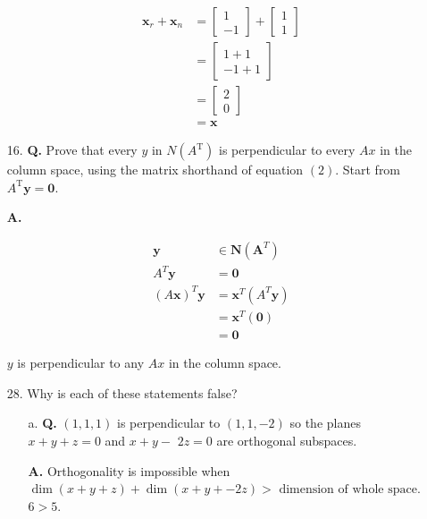 \documentclass[main.tex]{subfiles}
\begin{document}
\begin{enumerate}
    $$
    \begin{aligned}
    \boldsymbol{x}_{r}+\boldsymbol{x}_{n} &=\left[\begin{array}{c}
    1 \\
    -1
    \end{array}\right]+\left[\begin{array}{l}
    1 \\
    1
    \end{array}\right] \\
    &=\left[\begin{array}{c}
    1+1 \\
    -1+1
    \end{array}\right] \\
    &=\left[\begin{array}{l}
    2 \\
    0
    \end{array}\right] \\
    &=\boldsymbol{x}
    \end{aligned}
    $$
    
    \item [16.] \textbf{Q.} Prove that every $y$ in $N\left(A^{\mathrm{T}}\right)$ is perpendicular to every $A x$ in the column space, using the matrix shorthand of equation $(2)$. Start from $A^{\mathrm{T}} \boldsymbol{y}=\mathbf{0}$. 
    
    \textbf{A.}
    
    $$
    \begin{aligned}
    \bm{y} &\in \bm{N}\left(\bm{A}^{T}\right)\\
    A^{T} \bm{y} &= \bm{0}\\
    (A \bm{x})^{T} \bm{y} &= \bm{x}^{T}\left(A^{T} \bm{y}\right) \\
    &= \bm{x}^{T}(\bm{0}) \\
    &= \bm{0}
    \end{aligned}
    $$
    
    $y$ is perpendicular to any $Ax$ in the column space.
    
    \item [28.] Why is each of these statements false?
    \begin{enumerate}
        \item [a.] \textbf{Q.} $(1,1,1)$ is perpendicular to $(1,1,-2)$ so the planes $x+y+z=0$ and $x+y-$ $2 z=0$ are orthogonal subspaces.
        
        \textbf{A.} Orthogonality is impossible when $\operatorname{dim}(x+y+z) + \operatorname{dim}(x+y+-2z) > \text{ dimension of whole space}$. $6>5$.\\
        

\end{enumerate}
\end{enumerate}
\end{document}

